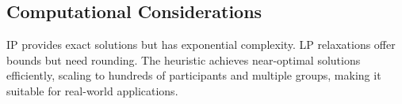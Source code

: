 \subsection*{Computational Considerations}
IP provides exact solutions but has exponential complexity. LP relaxations offer bounds but need rounding. The heuristic achieves near-optimal solutions efficiently, scaling to hundreds of participants and multiple groups, making it suitable for real-world applications.